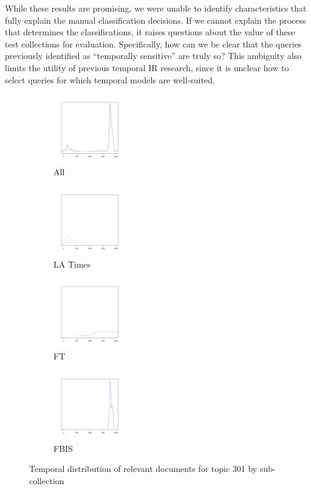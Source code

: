\documentclass[runningheads,a4paper]{llncs}
\begin{document}
While these results are promising, we were unable to identify characteristics that fully explain the manual classification decisions. If we cannot explain the process that determines the classifications, it raises questions about the value of these test collections for evaluation. Specifically, how can we be clear that the queries previously identified as ``temporally sensitive'' are truly so? This ambiguity also limits the utility of previous temporal IR research, since it is unclear how to select queries for which temporal models are well-suited.

\begin{figure}
\begin{subfigure}[t]{1in}
\includegraphics[width=3cm]{analysis/301/301-trec8.pdf}
\caption{All}
\end{subfigure}
\begin{subfigure}[t]{1in}
\includegraphics[width=3cm]{analysis/301/301-la.pdf}
\caption{LA Times}
\end{subfigure}
\begin{subfigure}[t]{1in}
\includegraphics[width=3cm]{analysis/301/301-ft.pdf}
\caption{FT}
\end{subfigure}
\begin{subfigure}[t]{1in}
\includegraphics[width=3cm]{analysis/301/301-fbis.pdf}
\caption{FBIS}
\end{subfigure}
\caption{Temporal distribution of relevant documents for topic 301 by sub-collection} 
\label{fig.301}
\end{figure}
\end{document}

